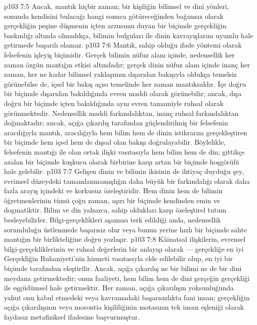 \vs p103 7:5 Ancak, mantık hiçbir zaman; bir kişiliğin bilimsel ve dini yönleri, sonunda kendisini bulacağı hangi sonuca götüreceğinden bağımsız olarak gerçekliğin peşine düşmenin içten arzusunu duyan bir biçimde gerçekliğin baskınlığı altında olmadıkça, bilimin bulguları ile dinin kavrayışlarını uyumlu hale getirmede başarılı olamaz.
\vs p103 7:6 Mantık, sahip olduğu ifade yöntemi olarak felsefenin işleyiş biçimidir. Gerçek bilimin nüfuz alanı içinde, nedensellik her zaman özgün mantığın etkisi altındadır; gerçek dinin nüfuz alanı içinde inanç her zaman, her ne kadar bilimsel yaklaşımın dışarıdan bakışıyla oldukça temelsiz görünebilse de, içsel bir bakış açısı temelinde her zaman mantıksaldır. İçe doğru bir biçimde dışarıdan bakıldığında evren maddi olarak görünebilir; ancak, dışa doğru bir biçimde içten bakıldığında aynı evren tamamiyle ruhsal olarak görünmektedir. Nedensellik maddi farkındalıktan, inanç ruhsal farkındalıktan doğmaktadır; ancak, açığa çıkarılış tarafından güçlendirilmiş bir felsefenin aracılığıyla mantık, aracılığıyla hem bilim hem de dinin istikrarını gerçekleştiren bir biçimde hem içsel hem de dışsal olan bakışı doğrulayabilir. Böylelikle, felsefenin mantığı ile olan ortak ilişki vasıtasıyla hem bilim hem de din; gittikçe azalan bir biçimde kuşkucu olarak birbirine karşı artan bir biçimde hoşgörülü hale gelebilir.
\vs p103 7:7 Gelişen dinin ve bilimin ikisinin de ihtiyaç duyduğu şey, evrimsel düzeydeki tamamlanmamışlığın daha büyük bir farkındalığı olarak daha fazla arayış içindeki ve korkusuz özeleştiridir. Hem dinin hem de bilimin öğretmenlerinin tümü çoğu zaman, aşırı bir biçimde kendinden emin ve dogmatiktir. Bilim ve din yalnızca, sahip oldukları  karşı özeleştirel tutum besleyebilirler. Bilgi\hyp{}gerçeklikleri aşaması terk edildiği anda, nedensellik sorumluluğu üstlenmede başarısız olur veya bunun yerine hızlı bir biçimde sahte mantığın bir birlikteliğine doğru yozlaşır.
\vs p103 7:8 Kâinatsal ilişkilerin, evrensel bilgi\hyp{}gerçekliklerinin ve ruhsal değerlerin bir anlayışı olarak --- gerçekliğe en iyi Gerçekliğin Ruhaniyeti’nin hizmeti vasıtasıyla elde edilebilir olup, en iyi bir biçimde tarafından eleştirilir. Ancak, açığa çıkarılış ne bir bilimi ne de bir dini meydana getirmektedir; onun faaliyeti, hem bilim hem de dini gerçeğin gerçekliği ile eşgüdümsel hale getirmektir. Her zaman, açığa çıkarılışın yoksunluğunda yahut onu kabul etmedeki veya kavramadaki başarısızlıkta fani insan; gerçekliğin açığa çıkarılışının veya morontia kişililiğinin motasının tek insan eşleniği olarak faydasız metafiziksel ifadesine başvurmuştur.
